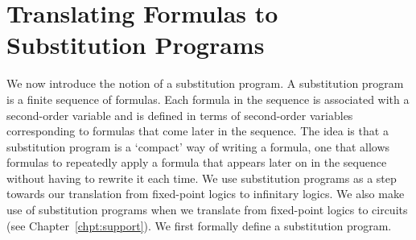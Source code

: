\documentclass[../main/thesis.tex]{subfiles}
\begin{document}







\section{Translating Formulas to Substitution Programs}
\label{chpt:gen-op--sec:substitution-programs}
We now introduce the notion of a substitution program. A substitution program is
a finite sequence of formulas. Each formula in the sequence is associated with a
second-order variable and is defined in terms of second-order variables
corresponding to formulas that come later in the sequence. The idea is that a
substitution program is a `compact' way of writing a formula, one that allows
formulas to repeatedly apply a formula that appears later on in the sequence
without having to rewrite it each time. We use substitution programs as a step
towards our translation from fixed-point logics to infinitary logics. We also
make use of substitution programs when we translate from fixed-point logics to
circuits (see Chapter~\ref{chpt:support}). We first formally define a
substitution program.
\end{document}

